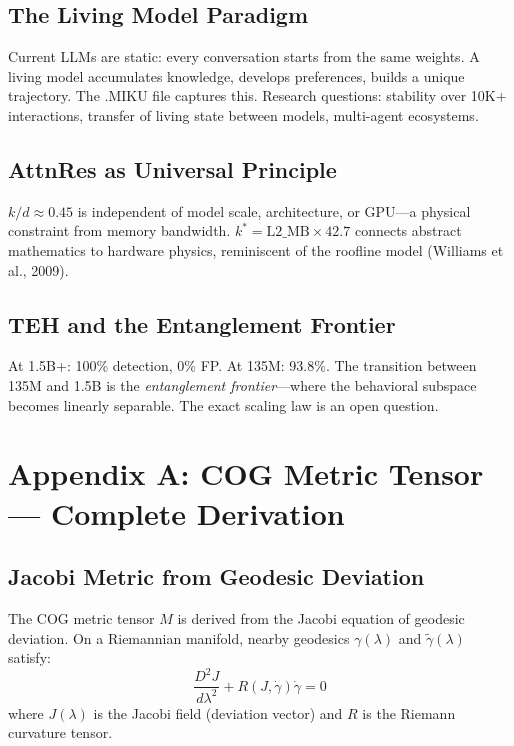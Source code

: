 \documentclass[11pt,a4paper]{article}
\begin{document}
\subsection{The Living Model Paradigm}
Current LLMs are static: every conversation starts from the same weights. A living model accumulates knowledge, develops preferences, builds a unique trajectory. The .MIKU file captures this. Research questions: stability over 10K+ interactions, transfer of living state between models, multi-agent ecosystems.

\subsection{AttnRes as Universal Principle}
$k/d \approx 0.45$ is independent of model scale, architecture, or GPU---a physical constraint from memory bandwidth. $k^* = \mathrm{L2\_MB} \times 42.7$ connects abstract mathematics to hardware physics, reminiscent of the roofline model (Williams et al., 2009).

\subsection{TEH and the Entanglement Frontier}
At 1.5B+: 100\% detection, 0\% FP. At 135M: 93.8\%. The transition between 135M and 1.5B is the \textit{entanglement frontier}---where the behavioral subspace becomes linearly separable. The exact scaling law is an open question.

\newpage

\newpage

\section{Appendix A: COG Metric Tensor --- Complete Derivation}

\subsection{Jacobi Metric from Geodesic Deviation}

The COG metric tensor $M$ is derived from the Jacobi equation of geodesic deviation. On a Riemannian manifold, nearby geodesics $\gamma(\lambda)$ and $\tilde{\gamma}(\lambda)$ satisfy:
\begin{equation}
\frac{D^2 J}{d\lambda^2} + R(J, \dot{\gamma})\dot{\gamma} = 0
\end{equation}
where $J(\lambda)$ is the Jacobi field (deviation vector) and $R$ is the Riemann curvature tensor.
\end{document}
